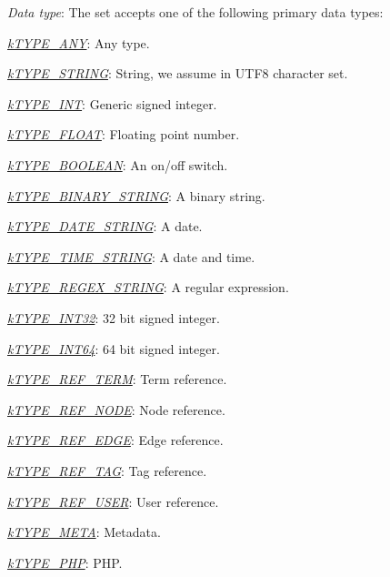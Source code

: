 \begin{DoxyItemize}
\item {\itshape Data type}\-: The set accepts one of the following primary data types\-: 
\begin{DoxyItemize}
\item {\itshape \hyperlink{}{k\-T\-Y\-P\-E\-\_\-\-A\-N\-Y}}\-: Any type. 
\item {\itshape \hyperlink{}{k\-T\-Y\-P\-E\-\_\-\-S\-T\-R\-I\-N\-G}}\-: String, we assume in U\-T\-F8 character set. 
\item {\itshape \hyperlink{}{k\-T\-Y\-P\-E\-\_\-\-I\-N\-T}}\-: Generic signed integer. 
\item {\itshape \hyperlink{}{k\-T\-Y\-P\-E\-\_\-\-F\-L\-O\-A\-T}}\-: Floating point number. 
\item {\itshape \hyperlink{}{k\-T\-Y\-P\-E\-\_\-\-B\-O\-O\-L\-E\-A\-N}}\-: An {\ttfamily on}/{\ttfamily off} switch. 
\item {\itshape \hyperlink{}{k\-T\-Y\-P\-E\-\_\-\-B\-I\-N\-A\-R\-Y\-\_\-\-S\-T\-R\-I\-N\-G}}\-: A binary string. 
\item {\itshape \hyperlink{}{k\-T\-Y\-P\-E\-\_\-\-D\-A\-T\-E\-\_\-\-S\-T\-R\-I\-N\-G}}\-: A date. 
\item {\itshape \hyperlink{}{k\-T\-Y\-P\-E\-\_\-\-T\-I\-M\-E\-\_\-\-S\-T\-R\-I\-N\-G}}\-: A date and time. 
\item {\itshape \hyperlink{}{k\-T\-Y\-P\-E\-\_\-\-R\-E\-G\-E\-X\-\_\-\-S\-T\-R\-I\-N\-G}}\-: A regular expression. 
\item {\itshape \hyperlink{}{k\-T\-Y\-P\-E\-\_\-\-I\-N\-T32}}\-: 32 bit signed integer. 
\item {\itshape \hyperlink{}{k\-T\-Y\-P\-E\-\_\-\-I\-N\-T64}}\-: 64 bit signed integer. 
\item {\itshape \hyperlink{}{k\-T\-Y\-P\-E\-\_\-\-R\-E\-F\-\_\-\-T\-E\-R\-M}}\-: Term reference. 
\item {\itshape \hyperlink{}{k\-T\-Y\-P\-E\-\_\-\-R\-E\-F\-\_\-\-N\-O\-D\-E}}\-: Node reference. 
\item {\itshape \hyperlink{}{k\-T\-Y\-P\-E\-\_\-\-R\-E\-F\-\_\-\-E\-D\-G\-E}}\-: Edge reference. 
\item {\itshape \hyperlink{}{k\-T\-Y\-P\-E\-\_\-\-R\-E\-F\-\_\-\-T\-A\-G}}\-: Tag reference. 
\item {\itshape \hyperlink{}{k\-T\-Y\-P\-E\-\_\-\-R\-E\-F\-\_\-\-U\-S\-E\-R}}\-: User reference. 
\item {\itshape \hyperlink{}{k\-T\-Y\-P\-E\-\_\-\-M\-E\-T\-A}}\-: Metadata. 
\item {\itshape \hyperlink{}{k\-T\-Y\-P\-E\-\_\-\-P\-H\-P}}\-: P\-H\-P. 

\end{DoxyItemize}
\end{DoxyItemize}
